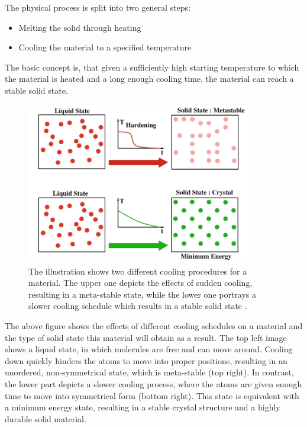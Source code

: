 The physical process is split into two general steps:
\begin{itemize}
	\item Melting the solid through heating
	\item Cooling the material to a specified temperature
\end{itemize}
The basic concept is, that given a sufficiently high starting temperature to which the material is heated and a long enough cooling time, the material can reach a stable solid state. 

\begin{figure}[h]
	\centering
	\includegraphics[width=0.9\textwidth]{bilder/AnnealingIllustration.png}
	\caption{The illustration shows two different cooling procedures for a material. The upper one depicts the effects of sudden cooling, resulting in a meta-stable state, while the lower one portrays a slower cooling schedule which results in a stable solid state \cite{delahaye_simulated_2019}.}
	\label{fig:annealingIllustration}
\end{figure}


The above figure shows the effects of different cooling schedules on a material and the type of solid state this material will obtain as a result.
The top left image shows a liquid state, in which molecules are free and can move around.
Cooling down quickly hinders the atoms to move into proper positions, resulting in an unordered, non-symmetrical state, which is meta-stable (top right).
In contrast, the lower part depicts a slower cooling process, where the atoms are given enough time to move into symmetrical form (bottom right).
This state is equivalent with a minimum energy state, resulting in a stable crystal structure and a highly durable solid material. 

